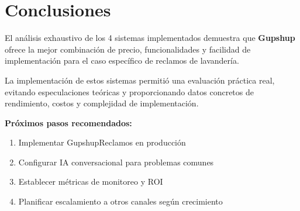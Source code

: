 \documentclass{article}
\begin{document}
\section{Conclusiones}

El análisis exhaustivo de los 4 sistemas implementados demuestra que \textbf{Gupshup} ofrece la mejor combinación de precio, funcionalidades y facilidad de implementación para el caso específico de reclamos de lavandería.

La implementación de estos sistemas permitió una evaluación práctica real, evitando especulaciones teóricas y proporcionando datos concretos de rendimiento, costos y complejidad de implementación.

\textbf{Próximos pasos recomendados:}
\begin{enumerate}
    \item Implementar GupshupReclamos en producción
    \item Configurar IA conversacional para problemas comunes
    \item Establecer métricas de monitoreo y ROI
    \item Planificar escalamiento a otros canales según crecimiento
\end{enumerate}
\end{document}
